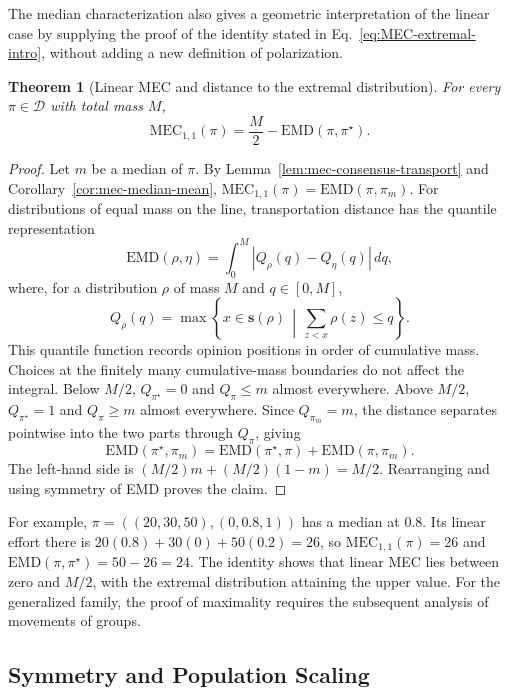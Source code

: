 \documentclass{article}
\theoremstyle{plain}
\newtheorem{theorem}{Theorem}
\theoremstyle{remark}
\begin{document}
The median characterization also gives a geometric interpretation of the linear case by supplying the proof of the identity stated in Eq.~\eqref{eq:MEC-extremal-intro}, without adding a new definition of polarization.

\begin{theorem}[Linear MEC and distance to the extremal distribution]\label{th:mec-linear-extremal}
For every $\pi\in\mathcal{D}$ with total mass $M$,
\[
\mathrm{MEC}_{1,1}(\pi)
=\frac{M}{2}-\mathrm{EMD}(\pi,\pi^\star).
\]
\end{theorem}
\begin{proof}
Let $m$ be a median of $\pi$. By Lemma~\ref{lem:mec-consensus-transport} and Corollary~\ref{cor:mec-median-mean}, $\mathrm{MEC}_{1,1}(\pi)=\mathrm{EMD}(\pi,\pi_m)$. For distributions of equal mass on the line, transportation distance has the quantile representation \citep{vallender1974calculation,geher2020isometric}
\[
\mathrm{EMD}(\rho,\eta)
=\int_0^M|Q_\rho(q)-Q_\eta(q)|\,dq,
\]
where, for a distribution $\rho$ of mass $M$ and $q\in[0,M]$,
\[
Q_\rho(q)=\max\left\{x\in\boldsymbol{s}(\rho)
\,\middle|\,\sum_{z<x}\rho(z)\leq q\right\}.
\]
This quantile function records opinion positions in order of cumulative mass. Choices at the finitely many cumulative-mass boundaries do not affect the integral. Below $M/2$, $Q_{\pi^\star}=0$ and $Q_\pi\leq m$ almost everywhere. Above $M/2$, $Q_{\pi^\star}=1$ and $Q_\pi\geq m$ almost everywhere. Since $Q_{\pi_m}=m$, the distance separates pointwise into the two parts through $Q_\pi$, giving
\[
\mathrm{EMD}(\pi^\star,\pi_m)
=\mathrm{EMD}(\pi^\star,\pi)+\mathrm{EMD}(\pi,\pi_m).
\]
The left-hand side is $(M/2)m+(M/2)(1-m)=M/2$. Rearranging and using symmetry of EMD proves the claim.
\end{proof}

For example, $\pi=((20,30,50),(0,0.8,1))$ has a median at $0.8$. Its linear effort there is $20(0.8)+30(0)+50(0.2)=26$, so $\mathrm{MEC}_{1,1}(\pi)=26$ and $\mathrm{EMD}(\pi,\pi^\star)=50-26=24$. The identity shows that linear MEC lies between zero and $M/2$, with the extremal distribution attaining the upper value. For the generalized family, the proof of maximality requires the subsequent analysis of movements of groups.

\subsection{Symmetry and Population Scaling}\label{subsec:mec-symmetry-scaling}
\end{document}
